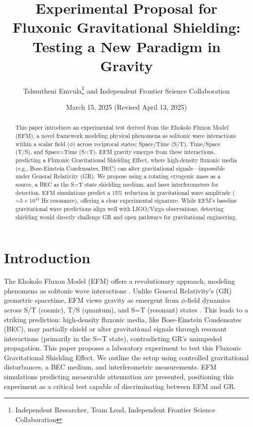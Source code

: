 \documentclass[11pt]{article}
\title{Experimental Proposal for Fluxonic Gravitational Shielding: Testing a New Paradigm in Gravity}
\author{Tshuutheni Emvula\thanks{Independent Researcher, Team Lead, Independent Frontier Science Collaboration} and Independent Frontier Science Collaboration}
\date{March 15, 2025 (Revised April 13, 2025)} %
\begin{document}
\maketitle

\begin{abstract}
This paper introduces an experimental test derived from the Ehokolo Fluxon Model (EFM), a novel framework modeling physical phenomena as solitonic wave interactions within a scalar field (\(\phi\)) across reciprocal states: Space/Time (S/T), Time/Space (T/S), and Space=Time (S=T). EFM gravity emerges from these interactions, predicting a Fluxonic Gravitational Shielding Effect, where high-density fluxonic media (e.g., Bose-Einstein Condensates, BEC) can alter gravitational signals—impossible under General Relativity (GR). We propose using a rotating cryogenic mass as a source, a BEC as the S=T state shielding medium, and laser interferometers for detection. EFM simulations predict a 15\% reduction in gravitational wave amplitude (\(\sim 5\times 10^{14}\) Hz resonance), offering a clear experimental signature. While EFM's baseline gravitational wave predictions align well with LIGO/Virgo observations, detecting shielding would directly challenge GR and open pathways for gravitational engineering.
\end{abstract}

\section{Introduction}
The Ehokolo Fluxon Model (EFM) offers a revolutionary approach, modeling phenomena as solitonic wave interactions \citep{EFM_Compendium}. Unlike General Relativity's (GR) geometric spacetime, EFM views gravity as emergent from \(\phi\)-field dynamics across S/T (cosmic), T/S (quantum), and S=T (resonant) states \citep{EFM_ZPE_Gravity}. This leads to a striking prediction: high-density fluxonic media, like Bose-Einstein Condensates (BEC), may partially shield or alter gravitational signals through resonant interactions (primarily in the S=T state), contradicting GR's unimpeded propagation. This paper proposes a laboratory experiment to test this Fluxonic Gravitational Shielding Effect. We outline the setup using controlled gravitational disturbances, a BEC medium, and interferometric measurements. EFM simulations predicting measurable attenuation are presented, positioning this experiment as a critical test capable of discriminating between EFM and GR.
\end{document}
